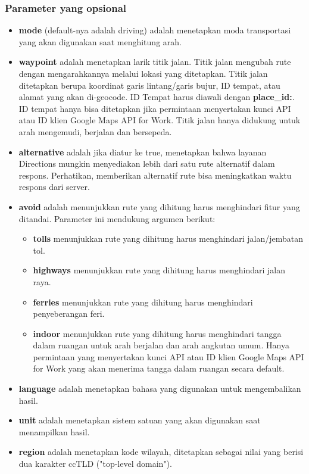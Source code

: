 \subsubsection{Parameter yang opsional}
\label{subsubsec:parameteropsional}
\begin{itemize}
	\item \textbf{mode} (default-nya adalah driving) adalah menetapkan moda transportasi yang akan digunakan saat menghitung arah. 
	\item \textbf{waypoint} adalah menetapkan larik titik jalan. Titik jalan mengubah rute dengan mengarahkannya melalui lokasi yang ditetapkan. Titik jalan ditetapkan berupa koordinat garis lintang/garis bujur, ID tempat, atau alamat yang akan di-geocode. ID Tempat harus diawali dengan \textbf{place\_id:}. ID tempat hanya bisa ditetapkan jika permintaan menyertakan kunci API atau ID klien Google Maps API for Work. Titik jalan hanya didukung untuk arah mengemudi, berjalan dan bersepeda.
	\item \textbf{alternative} adalah jika diatur ke true, menetapkan bahwa layanan Directions mungkin menyediakan lebih dari satu rute alternatif dalam respons. Perhatikan, memberikan alternatif rute bisa meningkatkan waktu respons dari server.
	\item \textbf{avoid} adalah menunjukkan rute yang dihitung harus menghindari fitur yang ditandai. Parameter ini mendukung argumen berikut: 
	\begin{itemize}
		\item \textbf{tolls} menunjukkan rute yang dihitung harus menghindari jalan/jembatan tol.
		\item \textbf{highways} menunjukkan rute yang dihitung harus menghindari jalan raya.
		\item \textbf{ferries} menunjukkan rute yang dihitung harus menghindari penyeberangan feri.
		\item \textbf{indoor} menunjukkan rute yang dihitung harus menghindari tangga dalam ruangan untuk arah berjalan dan arah angkutan umum. Hanya permintaan yang menyertakan kunci API atau ID klien Google Maps API for Work yang akan menerima tangga dalam ruangan secara default.
	\end{itemize}
	\item \textbf{language} adalah menetapkan bahasa yang digunakan untuk mengembalikan hasil.
	\item \textbf{unit} adalah menetapkan sistem satuan yang akan digunakan saat menampilkan hasil.
	\item \textbf{region} adalah menetapkan kode wilayah, ditetapkan sebagai nilai yang berisi dua karakter ccTLD ("top-level domain").

\end{itemize}
